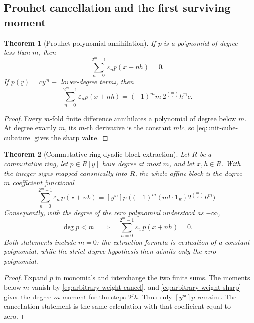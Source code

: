 \documentclass[11pt,oneside]{article}
\numberwithin{equation}{section}
\newtheorem{theorem}{Theorem}[section]
\theoremstyle{definition}
\theoremstyle{remark}
\newcommand{\eps}{\varepsilon}
\begin{document}
\subsection{Prouhet cancellation and the first surviving moment}

\begin{theorem}[Prouhet polynomial annihilation]
\label{thm:prouhet}
If \(p\) is a polynomial of degree less than \(m\), then
\begin{equation}
  \boxed{
  \sum_{n=0}^{2^m-1}\eps_np(x+nh)=0.}
  \label{eq:prouhet-affine}
\end{equation}
If \(p(y)=cy^m+\) lower-degree terms, then
\begin{equation}
  \boxed{
  \sum_{n=0}^{2^m-1}\eps_np(x+nh)
  =(-1)^mm!2^{\binom m2}h^m c.}
  \label{eq:prouhet-sharp-polynomial}
\end{equation}
\end{theorem}

\begin{proof}
Every \(m\)-fold finite difference annihilates a polynomial of degree below
\(m\).  At degree exactly \(m\), its \(m\)-th derivative is the constant
\(m!c\), so \eqref{eq:unit-cube-cubature} gives the sharp value.
\end{proof}

\begin{theorem}[Commutative-ring dyadic block extraction]
\label{thm:prouhet-block-extraction}
Let \(R\) be a commutative ring, let \(p\in R[y]\) have degree at most
\(m\), and let \(x,h\in R\).  With the integer signs mapped canonically
into \(R\), the whole affine block is the degree-\(m\) coefficient
functional
\begin{equation}
 \boxed{
 \sum_{n=0}^{2^m-1}\eps_n\,p(x+nh)
 =[y^m]p\;
   \bigl((-1)^m(m!\cdot1_R)2^{\binom m2}h^m\bigr).}
 \label{eq:prouhet-block-extraction}
\end{equation}
Consequently, with the degree of the zero polynomial understood as
\(-\infty\),
\begin{equation}
 \deg p<m
 \quad\Longrightarrow\quad
 \sum_{n=0}^{2^m-1}\eps_n\,p(x+nh)=0.
 \label{eq:prouhet-block-cancellation}
\end{equation}
Both statements include \(m=0\): the extraction formula is evaluation of a
constant polynomial, while the strict-degree hypothesis then admits only the
zero polynomial.
\end{theorem}

\begin{proof}
Expand \(p\) in monomials and interchange the two finite sums.  The moments
below \(m\) vanish by \eqref{eq:arbitrary-weight-cancel}, and
\eqref{eq:arbitrary-weight-sharp} gives the degree-\(m\) moment for the steps
\(2^jh\).  Thus only \([y^m]p\) remains.  The cancellation statement is the
same calculation with that coefficient equal to zero.
\end{proof}
\end{document}
